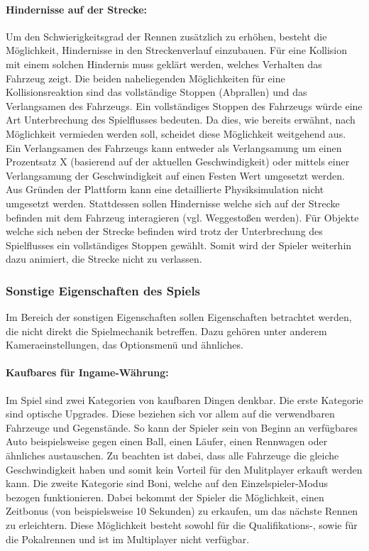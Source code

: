 		\paragraph{Hindernisse auf der Strecke:}\label{par:streckendesign2}
		Um den Schwierigkeitsgrad der Rennen zusätzlich zu erhöhen, besteht die Möglichkeit, Hindernisse in den Streckenverlauf einzubauen. Für eine Kollision mit einem solchen Hindernis muss geklärt werden, welches Verhalten das Fahrzeug zeigt. Die beiden naheliegenden Möglichkeiten für eine Kollisionsreaktion sind das vollständige Stoppen (Abprallen) und das Verlangsamen des Fahrzeugs.
		Ein vollständiges Stoppen des Fahrzeugs würde eine Art Unterbrechung des Spielflusses bedeuten. Da dies, wie bereits erwähnt, nach Möglichkeit vermieden werden soll, scheidet diese Möglichkeit weitgehend aus. Ein Verlangsamen des Fahrzeugs kann entweder als Verlangsamung um einen Prozentsatz X (basierend auf der aktuellen Geschwindigkeit) oder mittels einer Verlangsamung der Geschwindigkeit auf einen Festen Wert umgesetzt werden.
		Aus Gründen der Plattform kann eine detaillierte Physiksimulation nicht umgesetzt werden. Stattdessen sollen Hindernisse welche sich auf der Strecke befinden mit dem Fahrzeug interagieren (vgl. Weggestoßen werden). Für Objekte welche sich neben der Strecke befinden wird trotz der Unterbrechung des Spielflusses ein vollständiges Stoppen gewählt. Somit wird der Spieler weiterhin dazu animiert, die Strecke nicht zu verlassen.

	\subsubsection{Sonstige Eigenschaften des Spiels}
	Im Bereich der sonstigen Eigenschaften sollen Eigenschaften betrachtet werden, die nicht direkt die Spielmechanik betreffen. Dazu gehören unter anderem Kameraeinstellungen, das Optionsmenü und ähnliches.

		\paragraph{Kaufbares für Ingame-Währung:}
		Im Spiel sind zwei Kategorien von kaufbaren Dingen denkbar. Die erste Kategorie sind optische Upgrades. Diese beziehen sich vor allem auf die verwendbaren Fahrzeuge und Gegenstände. So kann der Spieler sein von Beginn an verfügbares Auto beispielsweise gegen einen Ball, einen Läufer, einen Rennwagen oder ähnliches austauschen. Zu beachten ist dabei, dass alle Fahrzeuge die gleiche Geschwindigkeit haben und somit kein Vorteil für den Mulitplayer erkauft werden kann. Die zweite Kategorie sind Boni, welche auf den Einzelspieler-Modus bezogen funktionieren. Dabei bekommt der Spieler die Möglichkeit, einen Zeitbonus (von beispielsweise 10 Sekunden) zu erkaufen, um das nächste Rennen zu erleichtern. Diese Möglichkeit besteht sowohl für die Qualifikations-, sowie für die Pokalrennen und ist im Multiplayer nicht verfügbar.

